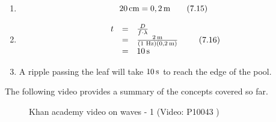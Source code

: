 {\begin{mdframed}[linewidth=4, leftmargin=40, rightmargin=40]
\begin{exercise}
\begin{enumerate}[noitemsep, label=\textbf{Step} \textbf{\arabic*}. ]
    \begin{equation}
    v=f\ensuremath{\cdot}\lambda \tag{7.13}
      \end{equation}
        \label{m38806*id320506}Therefore,\par 
        \label{m38806*id320512}\nopagebreak\noindent{}
    \begin{equation}
    t=\frac{D}{f\ensuremath{\cdot}\lambda }\tag{7.14}
      \end{equation}
        \item  
        \label{m38806*id320542}\nopagebreak\noindent{}
          
    \begin{equation}
    20\phantom{\rule{0.166667em}{0ex}}\mathrm{cm}=0,2\phantom{\rule{0.166667em}{0ex}}\mathrm{m}\tag{7.15}
      \end{equation}
        \item  
        \label{m38806*id320580}\nopagebreak\noindent{}
    \begin{equation}
    \begin{array}{ccc}\hfill t& =& \frac{D}{f\ensuremath{\cdot}\lambda }\hfill \\ & =& \frac{2\phantom{\rule{0.166667em}{0ex}}\mathrm{m}}{\left(1\phantom{\rule{0.277778em}{0ex}}\mathrm{Hz}\right)\left(0,2\phantom{\rule{0.166667em}{0ex}}\mathrm{m}\right)}\hfill \\ & =& 10\phantom{\rule{0.166667em}{0ex}}\mathrm{s}\hfill \end{array}\tag{7.16}
      \end{equation}
        \item  
        \label{m38806*id320694}A ripple passing the leaf will take $10\phantom{\rule{2pt}{0ex}}\mathrm{s}$ to reach the edge of the pool. \par 
        \end{enumerate}
    \end{exercise}
    \end{mdframed}
    }
    \noindent
\label{m38806*eip-872}The following video provides a summary of the concepts covered so far.
    \setcounter{subfigure}{0}
	\begin{figure}[H] %
    \textnormal{Khan academy video on waves - 1}\vspace{.1in} \nopagebreak
  \label{m38806*yt-media1}\label{m38806*yt-video1}
             { (Video:  P10043 )}
      \vspace{2pt}
    \vspace{.1in}
 \end{figure}       \par \label{m38806*secfhsst!!!underscore!!!id968}
